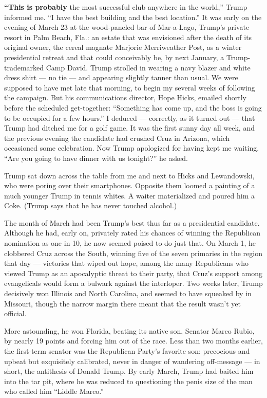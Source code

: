 \textbf{``This is probably} the most successful club anywhere in the
world,'' Trump informed me. ``I have the best building and the best
location.'' It was early on the evening of March 23 at the wood-paneled
bar of Mar-a-Lago, Trump's private resort in Palm Beach, Fla.: an estate
that was envisioned after the death of its original owner, the cereal
magnate Marjorie Merriweather Post, as a winter presidential retreat and
that could conceivably be, by next January, a Trump-trademarked Camp
David. Trump strolled in wearing a navy blazer and white dress shirt ---
no tie --- and appearing slightly tanner than usual. We were supposed to
have met late that morning, to begin my several weeks of following the
campaign. But his communications director, Hope Hicks, emailed shortly
before the scheduled get-together: ``Something has come up, and the boss
is going to be occupied for a few hours.'' I deduced --- correctly, as
it turned out --- that Trump had ditched me for a golf game. It was the
first sunny day all week, and the previous evening the candidate had
crushed Cruz in Arizona, which occasioned some celebration. Now Trump
apologized for having kept me waiting. ``Are you going to have dinner
with us tonight?'' he asked.

Trump sat down across the table from me and next to Hicks and
Lewandowski, who were poring over their smartphones. Opposite them
loomed a painting of a much younger Trump in tennis whites. A waiter
materialized and poured him a Coke. (Trump says that he has never
touched alcohol.)

The month of March had been Trump's best thus far as a presidential
candidate. Although he had, early on, privately rated his chances of
winning the Republican nomination as one in 10, he now seemed poised to
do just that. On March 1, he clobbered Cruz across the South, winning
five of the seven primaries in the region that day --- victories that
wiped out hope, among the many Republicans who viewed Trump as an
apocalyptic threat to their party, that Cruz's support among
evangelicals would form a bulwark against the interloper. Two weeks
later, Trump decisively won Illinois and North Carolina, and seemed to
have squeaked by in Missouri, though the narrow margin there meant that
the result wasn't yet official.

More astounding, he won Florida, beating its native son, Senator Marco
Rubio, by nearly 19 points and forcing him out of the race. Less than
two months earlier, the first-term senator was the Republican Party's
favorite son: precocious and upbeat but exquisitely calibrated, never in
danger of wandering off-message --- in short, the antithesis of Donald
Trump. By early March, Trump had baited him into the tar pit, where he
was reduced to questioning the penis size of the man who called him
``Liddle Marco.''

